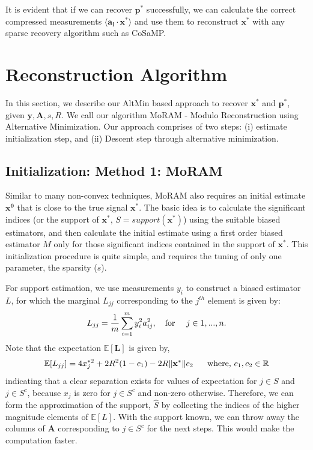 It is evident that if we can recover $\mathbf{p^*}$ successfully, we can calculate the correct compressed measurements $\langle \mathbf{a_i} \cdot \mathbf{x^*} \rangle$ and use them to reconstruct $\mathbf{x^*}$ with any sparse recovery algorithm such as CoSaMP.


\section{Reconstruction Algorithm}

In this section, we describe our AltMin based approach to recover $\mathbf{x^*}$ and $\mathbf{p^*}$, given $\mathbf{y, A}, s, R$. We call our algorithm MoRAM - Modulo Reconstruction using Alternative Minimization. Our approach comprises of two steps: (i) estimate initialization step, and (ii) Descent step through alternative minimization.

\subsection{Initialization: Method 1: MoRAM}
\label{sec:init}
Similar to many non-convex techniques, MoRAM also requires an initial estimate $\mathbf{{x}^0}$ that is close to the true signal $\mathbf{{x}^*}$. The basic idea is to calculate the significant indices (or the support of $\mathbf{{x}^*}$, $S=support(\mathbf{{x}^*})$) using the suitable biased estimators, and then calculate the initial estimate using a first order biased estimator $M$ only for those significant indices contained in the support of $\mathbf{{x}^*}$. This initialization procedure is quite simple, and requires the tuning of only one parameter, the sparsity ($s$).

For support estimation, we use measurements $y_{i}$ to construct a biased estimator $L$, for which the marginal $L_{jj}$ corresponding to the $j^{th}$ element is given by:
$$
L_{jj} = \frac{1}{m}\sum_{i=1}^{m}y_{i}^2 a_{ij}^2,~~~\textnormal{for}~~~~j \in {1,...,n}.
$$
Note that the expectation $\mathbb{E}[\mathbf{L}]$ is given by,
$$
\mathbb{E}[L_{jj}] = 4x_{j}^{*2}+2R^2(1-c_1)-2R\|\mathbf{{x}^*}\|c_2~~~~~\textnormal{where,}~c_1,c_2 \in \mathbb{R}
$$
indicating that a clear separation exists for values of expectation for $j \in S$ and $j \in S^c$, because $x_j$ is zero for $j \in S^c$ and non-zero otherwise. Therefore, we can form the approximation of the support, $\widehat{S}$ by collecting the indices of the higher magnitude elements of $\mathbb{E}[L]$. With the support known, we can throw away the columns of $\mathbf{A}$ corresponding to $j \in S^c$ for the next steps. This would make the computation faster.

